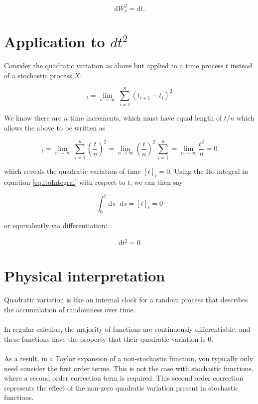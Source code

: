 \documentclass[12pt]{article}
\begin{document}
\begin{equation}
	\mathrm{d}W_s^2 = \mathrm{d}t.
\end{equation}


\section{Application to $dt^2$}

Consider the quadratic variation as above but applied to a time process $t$ instead of a stochastic process $X$:

\begin{equation}
	[t]_t =\lim\limits_{n\to \infty}\,\sum_{i=1}^n\left(t_{i+1} - t_i\right)^2
\end{equation}

\noindent We know there are $n$ time increments, which must have equal length of $t/n$ which allows the above to be written as


\begin{equation}
	[t]_t =\lim\limits_{n\to \infty}\,\sum_{i=1}^n\left(\frac{t}{n}\right)^2=\lim\limits_{n\to \infty}\left(\frac{t}{n}\right)^2\,\sum_{i=1}^n=\lim\limits_{n\to \infty}\frac{t^2}{n}=0
\end{equation}

\noindent which reveals the quadratic variation of time $[t]_t=0$. Using the Ito integral in equation \ref{eq:itoIntegral} with respect to $t$, we can then say


\begin{equation}
	\int_{0}^{t}\mathrm{d}s\cdot\mathrm{d}s =[t]_t=0
\end{equation}

\noindent or equivalently via differentiation:

\begin{eqnarray}
	\mathrm{d}t^2=0
\end{eqnarray}


\section{Physical interpretation}

Quadratic variation is like an internal clock for a random process that describes the accumulation of randomness over time.\\
\\
In regular calculus, the majority of functions are continuously differentiable, and these functions have the property that their quadratic variation is 0.\\
\\
As a result, in a Taylor expansion of a non-stochastic function, you typically only need consider the first order terms. This is not the case with stochastic functions, where a second order correction term is required. This second order correction represents the effect of the non-zero quadratic variation present in stochastic functions.
\end{document}
